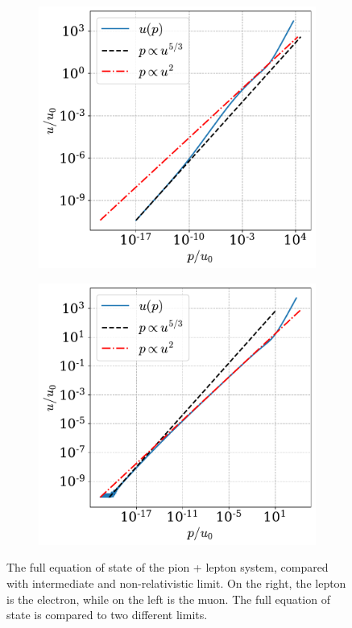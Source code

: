 \begin{figure}[!htb]
    \centering
    \begin{subfigure}{0.49\textwidth}
        \includegraphics[width=\textwidth]{../scripts/figurer/charge_neutrality/eos_lepton_limitse.pdf}
    \end{subfigure}
    \begin{subfigure}{0.49\textwidth}
        \includegraphics[width=\textwidth]{../scripts/figurer/charge_neutrality/eos_lepton_limitsmu.pdf}
    \end{subfigure}
    \caption{
        The full equation of state of the pion + lepton system, compared with intermediate and non-relativistic limit.
    On the right, the lepton is the electron, while on the left is the muon.
    The full equation of state is compared to two different limits.
    }
    \label{fig: intermediate regime}
\end{figure}

